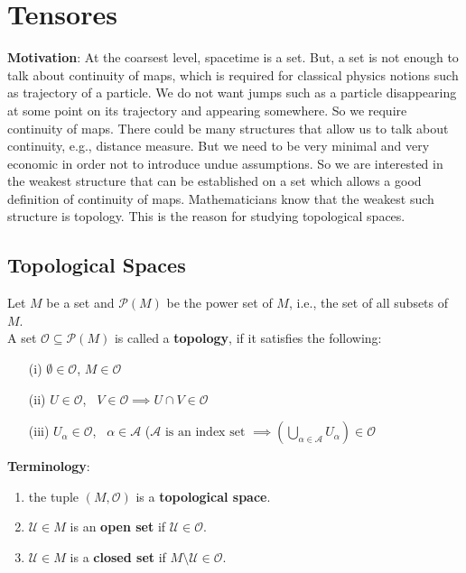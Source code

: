 \section{Tensores}
\begin{framed}
\textbf{Motivation}: At the coarsest level, spacetime is a set. But, a set  is not enough to talk about continuity of maps, which is required for classical physics notions such as trajectory of a particle. We do not want jumps such as a particle disappearing at some point on its trajectory and appearing somewhere. So we require continuity of maps. There could be many structures that allow us to talk about continuity, e.g., distance measure. But we need to be very minimal and very economic in order not to introduce undue assumptions. So we are interested in the weakest structure that can be established on a set which allows a good definition of continuity of maps. Mathematicians know that the weakest such structure is topology. This is the reason for studying topological spaces.
\end{framed}

\subsection{Topological Spaces}
\begin{definition}
  Let $M$ be a set and $\mathcal{P}(M)$ be the power set of $M$, i.e., the set of all subsets of $M$.   \\
A set $\mathcal{O} \subseteq \mathcal{P}(M)$ is called a \textbf{topology}, if it satisfies the following:
\begin{enumerate}
  \item[(i)] $\emptyset \in \mathcal{O}$, $M \in \mathcal{O}$ 
\item[(ii)] $U \in \mathcal{O}$, \, $V \in \mathcal{O} \implies U \cap V \in \mathcal{O}$ 
\item[(iii)] $U_{\alpha} \in \mathcal{O}$, \, $\alpha \in \mathcal{A}$ ($\mathcal{A} \text{ is an index set } \implies \left( \bigcup_{\alpha \in \mathcal{A}} U_{\alpha} \right) \in \mathcal{O}$
\end{enumerate}
\end{definition}

\textbf{Terminology}:
\begin{enumerate}
\item the tuple $(M , \mathcal{O})$ is a \textbf{topological space}.
\item $\mathcal{U} \in M$ is an \textbf{open set} if $\mathcal{U} \in \mathcal{O}$.
\item $\mathcal{U} \in M$ is a \textbf{closed set} if $M \setminus \mathcal{U} \in \mathcal{O}$.
\end{enumerate}

